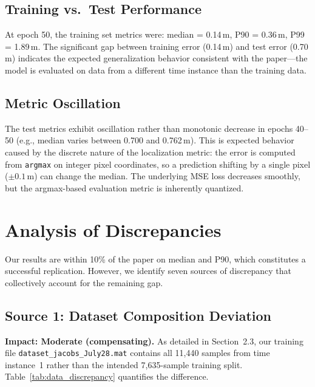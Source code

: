 \documentclass[12pt,a4paper]{article}
\begin{document}
\subsection{Training vs.\ Test Performance}

At epoch 50, the training set metrics were: median = 0.14\,m, P90 = 0.36\,m, P99 = 1.89\,m. The significant gap between training error (0.14\,m) and test error (0.70\,m) indicates the expected generalization behavior consistent with the paper---the model is evaluated on data from a different time instance than the training data.

\subsection{Metric Oscillation}

The test metrics exhibit oscillation rather than monotonic decrease in epochs 40--50 (e.g., median varies between 0.700 and 0.762\,m). This is expected behavior caused by the discrete nature of the localization metric: the error is computed from \texttt{argmax} on integer pixel coordinates, so a prediction shifting by a single pixel ($\pm 0.1$\,m) can change the median. The underlying MSE loss decreases smoothly, but the argmax-based evaluation metric is inherently quantized.

\section{Analysis of Discrepancies}
\label{sec:discrepancy}

Our results are within 10\% of the paper on median and P90, which constitutes a successful replication. However, we identify seven sources of discrepancy that collectively account for the remaining gap.

\subsection{Source 1: Dataset Composition Deviation}

\textbf{Impact: Moderate (compensating).} As detailed in Section~2.3, our training file \texttt{dataset\_jacobs\_July28.mat} contains all 11{,}440 samples from time instance~1 rather than the intended 7{,}635-sample training split. Table~\ref{tab:data_discrepancy} quantifies the difference.
\end{document}
